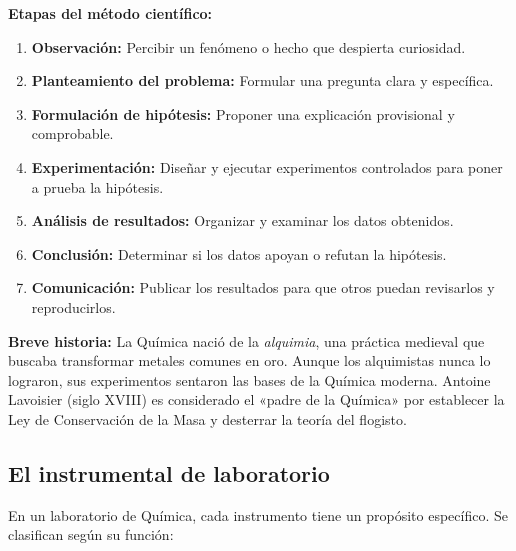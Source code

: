 \documentclass[12pt, letterpaper]{article}
\begin{document}
\begin{cuadroteoria}
  \textbf{Etapas del método científico:}
  \begin{enumerate}[leftmargin=*, label=\arabic*.]
    \item \textbf{Observación:} Percibir un fenómeno o hecho que despierta curiosidad.
    \item \textbf{Planteamiento del problema:} Formular una pregunta clara y específica.
    \item \textbf{Formulación de hipótesis:} Proponer una explicación provisional y comprobable.
    \item \textbf{Experimentación:} Diseñar y ejecutar experimentos controlados para poner a prueba la hipótesis.
    \item \textbf{Análisis de resultados:} Organizar y examinar los datos obtenidos.
    \item \textbf{Conclusión:} Determinar si los datos apoyan o refutan la hipótesis.
    \item \textbf{Comunicación:} Publicar los resultados para que otros puedan revisarlos y reproducirlos.
  \end{enumerate}
\end{cuadroteoria}

\begin{cuadroadvertencia}
  \textbf{Breve historia:} La Química nació de la \emph{alquimia}, una práctica medieval que buscaba transformar metales comunes en oro. Aunque los alquimistas nunca lo lograron, sus experimentos sentaron las bases de la Química moderna. Antoine Lavoisier (siglo XVIII) es considerado el «padre de la Química» por establecer la Ley de Conservación de la Masa y desterrar la teoría del flogisto.
\end{cuadroadvertencia}

\subsection{El instrumental de laboratorio}

En un laboratorio de Química, cada instrumento tiene un propósito específico. Se clasifican según su función:
\end{document}
